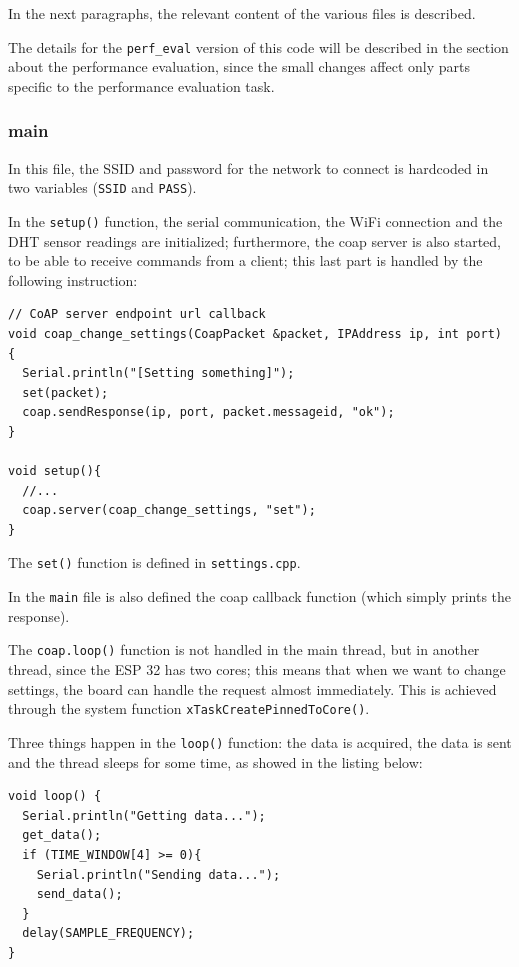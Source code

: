 \documentclass[]{article}
\begin{document}
In the next paragraphs, the relevant content of the various files is described.

The details for the \texttt{perf\_eval} version of this code will be described in the section about the performance evaluation, since the small changes affect only parts specific to the performance evaluation task.
\subsubsection{main}
In this file, the SSID and password for the network to connect is hardcoded in two variables (\texttt{SSID} and \texttt{PASS}). 

In the \texttt{setup()} function, the serial communication, the WiFi connection and the DHT sensor readings are initialized; furthermore, the coap server is also started, to be able to receive commands from a client; this last part is handled by the following instruction:

\begin{lstlisting}[style=C++, caption=Coap server]
// CoAP server endpoint url callback
void coap_change_settings(CoapPacket &packet, IPAddress ip, int port) {
  Serial.println("[Setting something]");
  set(packet);		
  coap.sendResponse(ip, port, packet.messageid, "ok");
}

void setup(){
  //...
  coap.server(coap_change_settings, "set");
}
\end{lstlisting}

The \texttt{set()} function is defined in \texttt{settings.cpp}.

In the \texttt{main} file is also defined the coap callback function (which simply prints the response).

The \texttt{coap.loop()} function is not handled in the main thread, but in another thread, since the ESP 32 has two cores; this means that when we want to change settings, the board can handle the request almost immediately. This is achieved through the system function \texttt{xTaskCreatePinnedToCore()}.

Three things happen in the \texttt{loop()} function: the data is acquired, the data is sent and the thread sleeps for some time, as showed in the listing below:

\begin{lstlisting}[style=C++, caption=Loop function]
void loop() {		
  Serial.println("Getting data...");
  get_data();
  if (TIME_WINDOW[4] >= 0){
    Serial.println("Sending data...");
    send_data();
  }
  delay(SAMPLE_FREQUENCY);	
}
\end{lstlisting}
\end{document}
